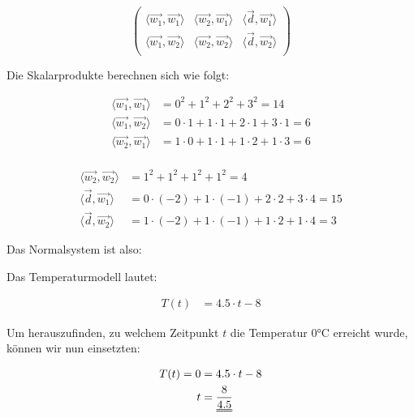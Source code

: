 \documentclass[11pt, openany]{book}
\begin{document}
\[
\left(
\begin{array}{cc|c}
      \langle \vec{w_1},  \vec{w_1} \rangle & \langle \vec{w_2},  \vec{w_1} \rangle & \langle \vec{d},  \vec{w_1} \rangle \\
      \langle \vec{w_1},  \vec{w_2} \rangle & \langle \vec{w_2},  \vec{w_2} \rangle & \langle \vec{d},  \vec{w_2} \rangle \\
\end{array}
\right)
\]

Die Skalarprodukte berechnen sich wie folgt:


\begin{minipage}[t]{0.5\textwidth}
\begin{align*}
\langle \vec{w_1},  \vec{w_1} \rangle &= 0^2 + 1^2 + 2^2 + 3^2 = 14 \\
\langle \vec{w_1},  \vec{w_2} \rangle &= 0\cdot1 + 1\cdot1 + 2\cdot1 + 3\cdot1 = 6 \\
\langle \vec{w_2},  \vec{w_1} \rangle &= 1\cdot0 + 1\cdot1 + 1\cdot2 + 1\cdot3 = 6 \\
\end{align*}
\end{minipage}%
\begin{minipage}[t]{0.5\textwidth}
\begin{align*}
\langle \vec{w_2},  \vec{w_2} \rangle &= 1^2 + 1^2 + 1^2 + 1^2 = 4 \\
\langle \vec{d},  \vec{w_1} \rangle &= 0\cdot(-2) + 1\cdot(-1) + 2\cdot2 + 3\cdot4 = 15 \\
\langle \vec{d},  \vec{w_2} \rangle &= 1\cdot(-2) + 1\cdot(-1) + 1\cdot2 + 1\cdot4 = 3
\end{align*}
\end{minipage}

Das Normalsystem ist also:
\begin{center}
\end{center}

Das Temperaturmodell lautet:

\begin{align*}
    T(t) &= 4.5 \cdot t - 8 
\end{align*}

Um herauszufinden, zu welchem Zeitpunkt $t$ die Temperatur 0°C erreicht wurde, können wir nun einsetzten:

\begin{align*}
    T(t) = 0 &= 4.5 \cdot t - 8 \\
    t &= \uuline{\frac{8}{4.5}}    
\end{align*}
\end{document}
